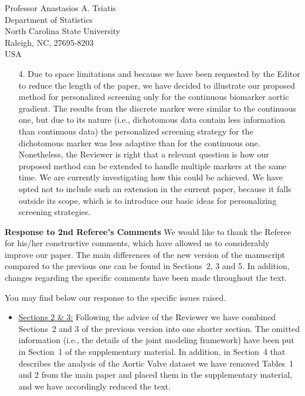 \documentclass[a4paper, 11pt]{letter}
\begin{document}
\begin{letter}{Professor Anastasios A. Tsiatis\\
Department of Statistics\\
North Carolina State University\\
Raleigh, NC, 27695-8203\\
USA}
\begin{enumerate}
\item[4.] Due to space limitations and because we have been requested by the Editor to reduce the length of the paper, we have decided to illustrate our proposed method for personalized screening only for the continuous biomarker aortic gradient. The results from the discrete marker were similar to the continuous one, but due to its nature (i.e., dichotomous data contain less information than continuous data) the personalized screening strategy for the dichotomous marker was less adaptive than for the continuous one. Nonetheless, the Reviewer is right that a relevant question is how our proposed method can be extended to handle multiple markers at the same time. We are currently  investigating how this could be achieved. We have opted not to include such an extension in the current paper, because it falls outside its scope, which is to introduce our basic ideas for personalizing screening strategies.
\end{enumerate}


\newpage
\textbf{Response to 2nd Referee's Comments}
\newline \newline
We would like to thank the Referee for his/her constructive comments, which have allowed us to considerably improve our paper. The main differences of the new version of the manuscript compared to the previous one can be found in Sections~2, 3 and 5. In addition, changes regarding the specific comments have been made throughout the text.

You may find below our response to the specific issues raised.

\begin{itemize} \itemsep=22pt
\item \underline{Sections 2 \& 3:} Following the advice of the Reviewer we have combined Sections~2 and 3 of the previous version into one shorter section. The omitted information (i.e., the details of the joint modeling framework) have been put in Section~1 of the supplementary material. In addition, in Section~4 that describes the analysis of the Aortic Valve dataset we have removed Tables~1 and 2 from the main paper and placed them in the supplementary material, and we have accordingly reduced the text.


\end{itemize}
\end{letter}
\end{document}
